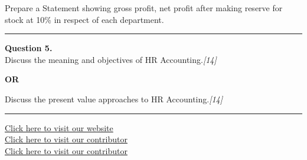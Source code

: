 \documentclass[11pt,a4paper]{article}
\newcommand{\pts}[1]{\hfill   \textit{[#1]}}
\begin{document}
Prepare a Statement showing gross profit, net profit after making reserve for stock at 10\% in respect of each department.

\medskip\rule{\linewidth}{0.2pt}




\noindent   \textbf{Question 5.} \\
Discuss the meaning and objectives of HR Accounting.\pts{14}

\centerline{   \textbf{OR}}

Discuss the present value approaches to HR Accounting.\pts{14}

\vfill
\rule{\linewidth}{0.4pt}

\begin{center}\small
\href{https://bhu-exam.vercel.app/}{Click here to visit our website}\\[4pt]
\href{https://me-aryan.vercel.app/}{Click here to visit our contributor}\\[4pt]
\href{https://quashan-me.vercel.app/}{Click here to visit our contributor}
\end{center}
\end{document}
